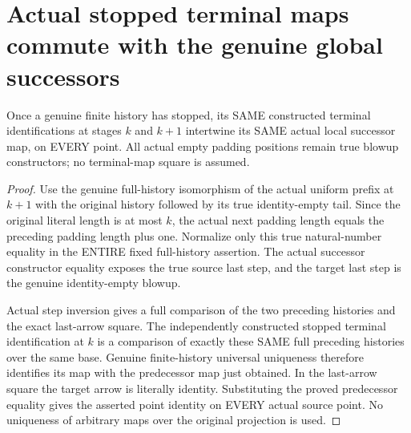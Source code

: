 \section{Actual stopped terminal maps commute with the genuine global successors}

\begin{lemma}
\label{hir:sharp-actual-curve-stopped-prefix-successor-square}
\leanok
Once a genuine finite history has stopped, its SAME constructed terminal
identifications at stages $k$ and $k+1$ intertwine its SAME actual local
successor map, on EVERY point. All actual empty padding positions remain
true blowup constructors; no terminal-map square is assumed.
\end{lemma}
\begin{proof}
Use the genuine full-history isomorphism of the actual uniform prefix at
$k+1$ with the original history followed by its true identity-empty tail.
Since the original literal length is at most $k$, the actual next padding
length equals the preceding padding length plus one. Normalize only this
true natural-number equality in the ENTIRE fixed full-history assertion.
The actual successor constructor equality exposes the true source last
step, and the target last step is the genuine identity-empty blowup.

Actual step inversion gives a full comparison of the two preceding
histories and the exact last-arrow square. The independently constructed
stopped terminal identification at $k$ is a comparison of exactly these
SAME full preceding histories over the same base. Genuine finite-history
universal uniqueness therefore identifies its map with the predecessor
map just obtained. In the last-arrow square the target arrow is literally
identity. Substituting the proved predecessor equality gives the asserted
point identity on EVERY actual source point. No uniqueness of arbitrary
maps over the original projection is used.
\end{proof}

